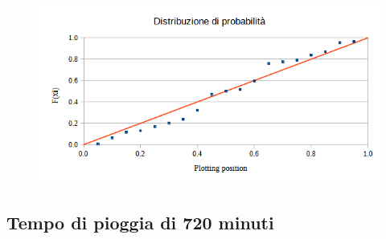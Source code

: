 \begin{figure}[H]\centering
    \includegraphics[scale=0.75]{immagini/distr_prob_360min.png}
\end{figure}

\subsection{Tempo di pioggia di 720 minuti}

